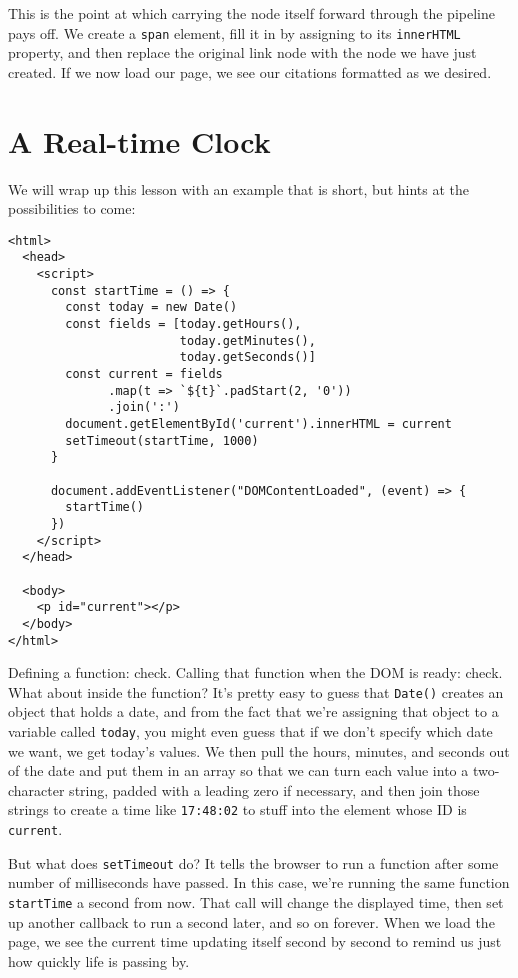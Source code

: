 This is the point at which carrying the node itself forward through the pipeline pays off.
We create a \texttt{span} element,
fill it in by assigning to its \texttt{innerHTML} property,
and then replace the original link node with the node we have just created.
If we now load our page,
we see our citations formatted as we desired.

\section{A Real-time Clock}\label{s:pages-clock}

We will wrap up this lesson with an example that is short,
but hints at the possibilities to come:

\begin{verbatim}
<html>
  <head>
    <script>
      const startTime = () => {
        const today = new Date()
        const fields = [today.getHours(),
                        today.getMinutes(),
                        today.getSeconds()]
        const current = fields
              .map(t => `${t}`.padStart(2, '0'))
              .join(':')
        document.getElementById('current').innerHTML = current
        setTimeout(startTime, 1000)
      }

      document.addEventListener("DOMContentLoaded", (event) => {
        startTime()
      })
    </script>
  </head>

  <body>
    <p id="current"></p>
  </body>
</html>
\end{verbatim}

Defining a function: check.
Calling that function when the DOM is ready: check.
What about inside the function?
It's pretty easy to guess that \texttt{Date()} creates an object that holds a date,
and from the fact that we're assigning that object to a variable called \texttt{today},
you might even guess that if we don't specify which date we want,
we get today's values.
We then pull the hours, minutes, and seconds out of the date and put them in an array
so that we can turn each value into a two-character string,
padded with a leading zero if necessary,
and then join those strings to create a time like \texttt{17:48:02}
to stuff into the element whose ID is \texttt{current}.

But what does \texttt{setTimeout} do?
It tells the browser to run a function after some number of milliseconds have passed.
In this case,
we're running the same function \texttt{startTime} a second from now.
That call will change the displayed time,
then set up another callback to run a second later,
and so on forever.
When we load the page,
we see the current time updating itself second by second
to remind us just how quickly life is passing by.

